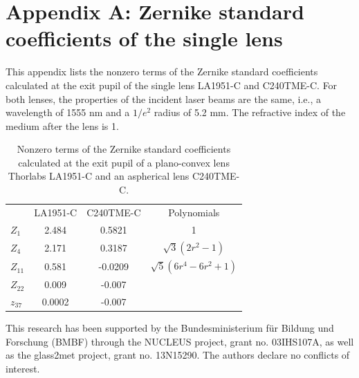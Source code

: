 \documentclass[9pt,twocolumn,twoside]{osajnl}
\begin{document}
\appendix
\section*{Appendix A: Zernike standard coefficients of the single lens}
\setcounter{table}{0}
\renewcommand{\thetable}{A\arabic{table}}
This appendix lists the nonzero terms of the Zernike standard coefficients calculated at the exit pupil of the single lens LA1951-C and C240TME-C. For both lenses, the properties of the incident laser beams are the same, i.e., a wavelength of 1555 nm and a $1/e^2$ radius of 5.2 mm. The refractive index of the medium after the lens is 1.
\begin{table}[h!]
	\centering
	\begin{tabular}[c]{l c c c }
		\toprule
		\rowcolor{black!20}
		 & LA1951-C & C240TME-C & Polynomials\\
		$Z_1$ & 2.484 & 0.5821 & 1 \\
		\rowcolor{black!10}
		$Z_4$ & 2.171 & 0.3187 & $\sqrt{3}(2r^2-1)$ \\
		$Z_{11}$ & 0.581 & -0.0209 & $\sqrt{5}(6r^4-6r^2+1)$ \\
		\rowcolor{black!10}
		$Z_{22}$ & 0.009 & -0.007 & \vtop{\hbox{\strut $\sqrt{7}(20r^6-30r^4$}\hbox{\strut $+12r^2-1)$}}\\
		$z_{37}$ & 0.0002 & -0.007 & \vtop{\hbox{\strut $\sqrt{9}(70r^8-140r^6$}\hbox{\strut $+90r^4-20r^2+1)$}}\\
		\bottomrule
	\end{tabular}	
	\caption{Nonzero terms of the Zernike standard coefficients calculated at the exit pupil of a plano-convex lens Thorlabs LA1951-C and an aspherical lens C240TME-C.}\label{tab:A1}
\end{table}

\begin{backmatter}
	 This research has been supported by the Bundesministerium für Bildung und Forschung (BMBF) through the NUCLEUS project, grant no. 03IHS107A, as well as the glass2met project, grant no. 13N15290.
	 The authors declare no conflicts of interest.
\end{backmatter}



\end{document}
